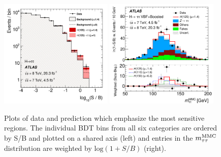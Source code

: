 \begin{figure}[tp]
  \centering
  \includegraphics[width=0.48\textwidth]{figures/HIGG-2013-32/fig_10}
  \includegraphics[width=0.48\textwidth]{figures/HIGG-2013-32/fig_11b}
  \caption{Plots of data and prediction which emphasize the most sensitive regions. The individual BDT bins from all six categories are ordered by S/B and plotted on a shared axis (left) and entries in the $m_{\tau\tau}^\text{MMC}$ distribution are weighted by $\text{log}(1+S/B)$ (right).}
  \label{fig:results-money-plots}
\end{figure}

